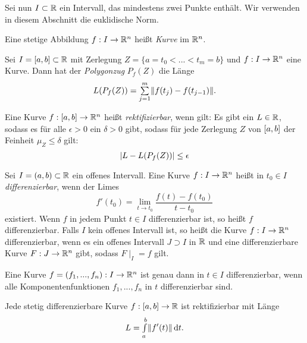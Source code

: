 \documentclass{cheat-sheet}
\begin{document}
\begin{nota}
  Sei nun $I \subset \mathbb{R}$ ein Intervall, das mindestens zwei Punkte enthält. Wir verwenden in diesem Abschnitt die euklidische Norm.
\end{nota}

\begin{defn}
  Eine stetige Abbildung $f : I \to \mathbb{R}^n$ heißt \emph{Kurve} im $\mathbb{R}^n$.\\
\end{defn}

\begin{defn}
  Sei $I = \left[ a, b \right] \subset \mathbb{R}$ mit Zerlegung $Z = \{ a = t_0 < ... < t_m = b \}$ und $f : I \to \mathbb{R}^n$ eine Kurve. Dann hat der \emph{Polygonzug} $P_f(Z)$ die Länge
  \[ L(P_f(Z)) = \sum_{j = 1}^{m} \norm{f(t_j) - f(t_{j-1})}. \]
\end{defn}

\begin{defn}
  Eine Kurve $f : \left[ a, b \right] \to \mathbb{R}^n$ heißt \emph{rektifizierbar}, wenn gilt: Es gibt ein $L \in \mathbb{R}$, sodass es für alle $\epsilon > 0$ ein $\delta > 0$ gibt, sodass für jede Zerlegung $Z$ von $\left[ a, b \right]$ der Feinheit $\mu_Z \le \delta$ gilt:
  \[ \lvert L - L(P_f(Z))\rvert \le \epsilon \]
\end{defn}


\begin{defn}
  Sei $I = (a, b) \subset \mathbb{R}$ ein offenes Intervall. Eine Kurve $f : I \to \mathbb{R}^n$ heißt in $t_0 \in I$ \emph{differenzierbar}, wenn der Limes
  \[ f'(t_0) = \lim_{t \to t_0} \frac{f(t) - f(t_0)}{t - t_0} \]
  existiert. Wenn $f$ in jedem Punkt $t \in I$ differenzierbar ist, so heißt $f$ differenzierbar.
  Falls $I$ kein offenes Intervall ist, so heißt die Kurve $f : I \to \mathbb{R}^n$ differenzierbar, wenn es ein offenes Intervall $J \supset I$ in $\mathbb{R}$ und eine differenzierbare Kurve $F : J \to \mathbb{R}^n$ gibt, sodass $F\mid_{I} = f$ gilt.
\end{defn}

\begin{bem}
  Eine Kurve $f = (f_1, ..., f_n) : I \to \mathbb{R}^n$ ist genau dann in $t \in I$ differenzierbar, wenn alle Komponentenfunktionen $f_1, ..., f_n$ in $t$ differenzierbar sind.
\end{bem}

\begin{satz}
  Jede stetig differenzierbare Kurve $f : \left[ a, b \right] \to \mathbb{R}$ ist rektifizierbar mit Länge
  \[ L = {\textstyle \int\limits_{a}^{b}} \lVert f'(t)\rVert \,\mathrm{d} t. \]
\end{satz}
\end{document}
